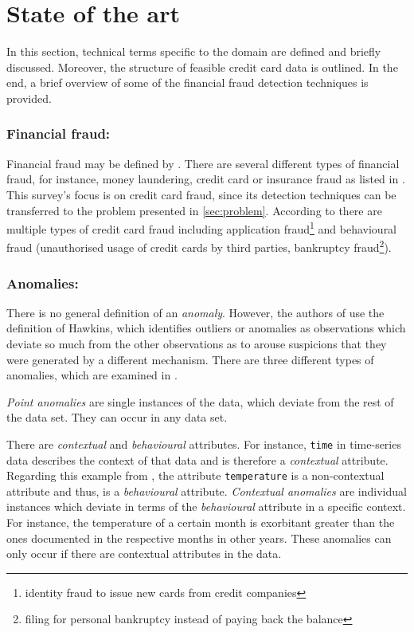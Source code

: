 
\section{State of the art}
\label{sec:state_of_art}
In this section, technical terms specific to the domain are defined and briefly discussed.
Moreover, the structure of feasible credit card data is outlined.
In the end, a brief overview of some of the financial fraud detection techniques is provided.

\subsubsection{Financial fraud:}
Financial fraud may be defined by .
There are several different types of financial fraud, for instance, money laundering, credit card or insurance fraud as listed in \cite{ff_review_techniques}.
This survey's focus is on credit card fraud, since its detection techniques can be transferred to the problem presented in \autoref{sec:problem}.
According to \cite{ff_review_techniques} there are multiple types of credit card fraud including application fraud\footnote{identity fraud to issue new cards from credit companies} and behavioural fraud (unauthorised usage of credit cards by third parties, bankruptcy fraud\footnote{filing for personal bankruptcy instead of paying back the balance}).


\subsubsection{Anomalies:}
There is no general definition of an \textit{anomaly}. However, the authors of \cite{ff_review_techniques} use the definition of Hawkins, which identifies outliers or anomalies as observations which deviate so much from the other observations as to arouse suspicions that they were generated by a different mechanism. There are three different types of anomalies, which are examined in \cite{gruhl2022, ff_review_techniques}.

\textit{Point anomalies} are single instances of the data, which deviate from the rest of the data set. They can occur in any data set.

There are \textit{contextual} and \textit{behavioural} attributes. For instance, \texttt{time} in time-series data describes the context of that data and is therefore a \textit{contextual} attribute. Regarding this example from \cite{ff_review_techniques}, the attribute \texttt{temperature} is a non-contextual attribute and thus, is a \textit{behavioural} attribute.
\textit{Contextual anomalies} are individual instances which deviate in terms of the \textit{behavioural} attribute in a specific context. For instance, the temperature of a certain month is exorbitant greater than the ones documented in the respective months in other years. These anomalies can only occur if there are contextual attributes in the data.

